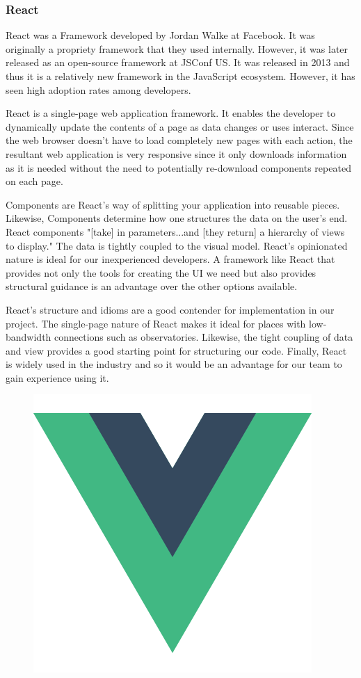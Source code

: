 \documentclass[12pt]{report}
\begin{document}
\subsubsection*{React}

React was a Framework developed by Jordan Walke at Facebook. It was originally a propriety framework that they used internally. However, it was later released as an open-source framework at JSConf US.\cite{reactlaunch} It was released in 2013 and thus it is a relatively new framework in the JavaScript ecosystem.\cite{reactlaunch} However, it has seen high adoption rates among developers.

React is a single-page web application framework. It enables the developer to dynamically update the contents of a page as data changes or uses interact. Since the web browser doesn't have to load completely new pages with each action, the resultant web application is very responsive since it only downloads information as it is needed without the need to potentially re-download components repeated on each page.

Components are React's way of splitting your application into reusable pieces. Likewise, Components determine how one structures the data on the user's end. React components "[take] in parameters...and [they return] a hierarchy of views to display."\cite{reacttutorial} The data is tightly coupled to the visual model. React's opinionated nature is ideal for our inexperienced developers. A framework like React that provides not only the tools for creating the UI we need but also provides structural guidance is an advantage over the other options available.

React's structure and idioms are a good contender for implementation in our project. The single-page nature of React makes it ideal for places with low-bandwidth connections such as observatories. Likewise, the tight coupling of data and view provides a good starting point for structuring our code. Finally, React is widely used in the industry and so it would be an advantage for our team to gain experience using it.

\newpage

\begin{figure}[h]
	\centering
	\includegraphics[width=0.25\linewidth]{vue}
\end{figure}
\end{document}
